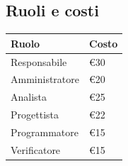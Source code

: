 \documentclass[12pt,a4paper]{article}
\begin{document}
\subsection{Ruoli e costi}

\begin{tabular}{| l | l |}
    \hline
    Ruolo & Costo \\ \hline
    Responsabile & \euro{}30 \\ \hline
    Amministratore & \euro{}20 \\ \hline
    Analista & \euro{}25 \\ \hline
    Progettista & \euro{}22 \\ \hline
    Programmatore & \euro{}15 \\ \hline
    Verificatore & \euro{}15 \\ \hline
\end{tabular}
\end{document}
